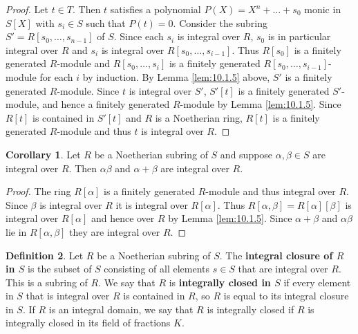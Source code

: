 \documentclass{article}
\newcommand{\rb}[1]{\left( #1 \right)}
\renewcommand{\sb}[1]{\left[ #1 \right]}
\theoremstyle{definition}\newtheorem{definition}{Definition}[subsection]
\theoremstyle{definition}\newtheorem{remark}[definition]{Remark}
\theoremstyle{definition}\newtheorem*{example}{Example}
\theoremstyle{definition}\newtheorem*{note}{Note}
\newtheorem{corollary}[definition]{Corollary}
\begin{document}
\begin{proof}
Let $ t \in T $. Then $ t $ satisfies a polynomial $ P\rb{X} = X^n + \dots + s_0 $ monic in $ S\sb{X} $ with $ s_i \in S $ such that $ P\rb{t} = 0 $. Consider the subring $ S' = R\sb{s_0, \dots, s_{n - 1}} $ of $ S $. Since each $ s_i $ is integral over $ R $, $ s_0 $ is in particular integral over $ R $ and $ s_i $ is integral over $ R\sb{s_0, \dots, s_{i - 1}} $. Thus $ R\sb{s_0} $ is a finitely generated $ R $-module and $ R\sb{s_0, \dots, s_i} $ is a finitely generated $ R\sb{s_0, \dots, s_{i - 1}} $-module for each $ i $ by induction. By Lemma \ref{lem:10.1.5} above, $ S' $ is a finitely generated $ R $-module. Since $ t $ is integral over $ S' $, $ S'\sb{t} $ is a finitely generated $ S' $-module, and hence a finitely generated $ R $-module by Lemma \ref{lem:10.1.5}. Since $ R\sb{t} $ is contained in $ S'\sb{t} $ and $ R $ is a Noetherian ring, $ R\sb{t} $ is a finitely generated $ R $-module and thus $ t $ is integral over $ R $.
\end{proof}

\begin{corollary}
Let $ R $ be a Noetherian subring of $ S $ and suppose $ \alpha, \beta \in S $ are integral over $ R $. Then $ \alpha\beta $ and $ \alpha + \beta $ are integral over $ R $.
\end{corollary}

\begin{proof}
The ring $ R\sb{\alpha} $ is a finitely generated $ R $-module and thus integral over $ R $. Since $ \beta $ is integral over $ R $ it is integral over $ R\sb{\alpha} $. Thus $ R\sb{\alpha, \beta} = R\sb{\alpha}\sb{\beta} $ is integral over $ R\sb{\alpha} $ and hence over $ R $ by Lemma \ref{lem:10.1.5}. Since $ \alpha + \beta $ and $ \alpha\beta $ lie in $ R\sb{\alpha, \beta} $ they are integral over $ R $.
\end{proof}


\begin{definition}
Let $ R $ be a Noetherian subring of $ S $. The \textbf{integral closure of $ R $ in $ S $} is the subset of $ S $ consisting of all elements $ s \in S $ that are integral over $ R $. This is a subring of $ R $. We say that $ R $ is \textbf{integrally closed in $ S $} if every element in $ S $ that is integral over $ R $ is contained in $ R $, so $ R $ is equal to its integral closure in $ S $. If $ R $ is an integral domain, we say that $ R $ is integrally closed if $ R $ is integrally closed in its field of fractions $ K $.
\end{definition}
\end{document}
